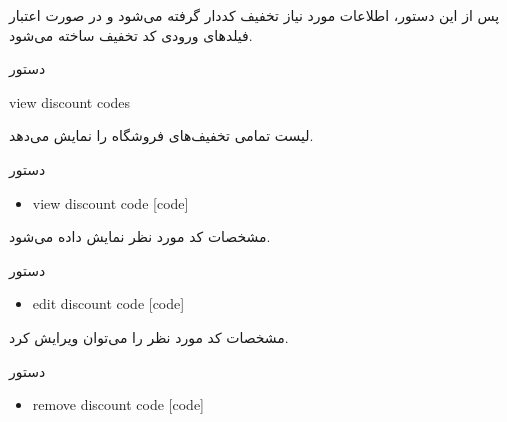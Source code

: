 \documentclass[]{article}
\begin{document}
پس از این دستور، اطلاعات مورد نیاز تخفیف کددار گرفته می‌شود و در صورت اعتبار فیلدهای ورودی کد تخفیف ساخته می‌شود.


\hrulefill


\begin{mybox}[colback=yellow]{دستور}

\begin{latin}

view discount codes

\end{latin}

\end{mybox}

لیست تمامی تخفیف‌های فروشگاه را نمایش می‌دهد.


\begin{mybox}[colback=brilliantlavender]{دستور}


\begin{latin}

\begin{itemize}[label = {$\Rightarrow$}]

\item
view discount code [code]

\end{itemize}

\end{latin}

\end{mybox}

مشخصات کد مورد نظر نمایش داده می‌شود.


\begin{mybox}[colback=brilliantlavender]{دستور}


\begin{latin}

\begin{itemize}[label = {$\Rightarrow$}]

\item
edit discount code [code]

\end{itemize}

\end{latin}

\end{mybox}


مشخصات کد مورد نظر را می‌توان ویرایش کرد.

\begin{mybox}[colback=brilliantlavender]{دستور}


\begin{latin}

\begin{itemize}[label = {$\Rightarrow$}]

\item
remove discount code [code]

\end{itemize}

\end{latin}

\end{mybox}
\end{document}
